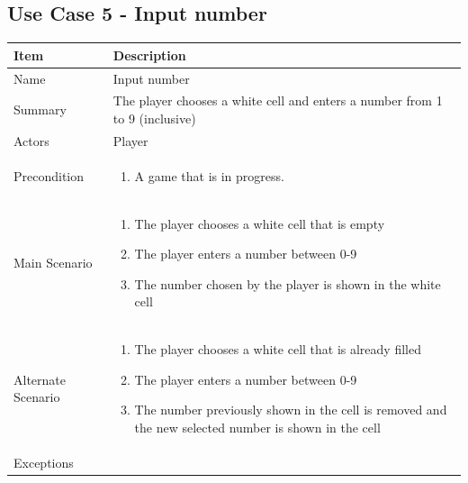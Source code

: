 \documentclass[12pt]{article}
\begin{document}
\newpage


\subsection{Use Case 5 - Input number}

\begin{center}
\setlength{\tabcolsep}{18pt}
\renewcommand{\arraystretch}{1.3}
\begin{tabular}{ |p{3.4cm}|p{12cm}| }
    \hline
    \textbf{Item} & \textbf{Description} \\
    \hline
    Name & Input number \\
    \hline
    Summary & The player chooses a white cell and enters a number from 1 to 9 (inclusive) \\
    \hline
    Actors & Player \\
    \hline
    Precondition & 
    \vspace*{-0.1in}
    \begin{enumerate}[leftmargin=0.2in]
        \item A game that is in progress.
    \end{enumerate}  \\
    \hline
    Main Scenario &     
    \vspace*{-0.1in}
    \begin{enumerate}[leftmargin=0.2in]
        \item The player chooses a white cell that is empty
        \item The player enters a number between 0-9
        \item The number chosen by the player is shown in the white cell
    \end{enumerate}  \\
    \hline
    Alternate Scenario &     
    \vspace*{-0.1in}
    \begin{enumerate}[leftmargin=0.2in]
        \item The player chooses a white cell that is already filled
        \item The player enters a number between 0-9
        \item The number previously shown in the cell is removed and the new selected number is shown in the cell
    \end{enumerate}  \\
    \hline
    Exceptions & 
    \vspace*{-0.1in}

\end{tabular}
\end{center}
\end{document}

